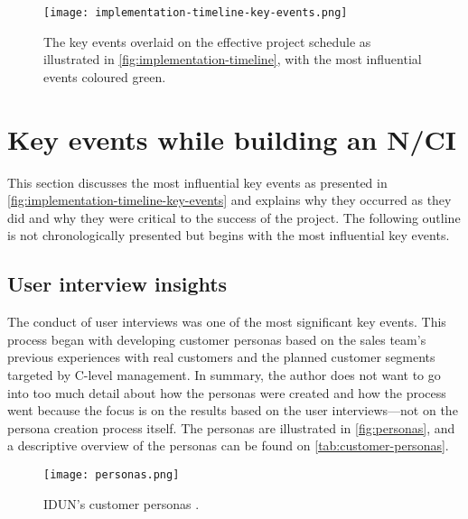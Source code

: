 \begin{figure}[!ht]
  \centering
  \texttt{[image: implementation-timeline-key-events.png]}
  \caption{The key events overlaid on the effective project schedule as illustrated in \autoref{fig:implementation-timeline}, with the most influential events coloured green.}
  \label{fig:implementation-timeline-key-events}
\end{figure}

\section{Key events while building an N/CI}
\label{chapter4-key-events}

This section discusses the most influential key events as presented in \autoref{fig:implementation-timeline-key-events} and explains why they occurred as they did and why they were critical to the success of the project. The following outline is not chronologically presented but begins with the most influential key events.

\subsection{User interview insights}
\label{chapter4-user-interview-insights}

The conduct of user interviews was one of the most significant key events. This process began with developing customer personas based on the sales team’s previous experiences with real customers and the planned customer segments targeted by C-level management. In summary, the author does not want to go into too much detail about how the personas were created and how the process went because the focus is on the results based on the user interviews—not on the persona creation process itself. The personas are illustrated in \autoref{fig:personas}, and a descriptive overview of the personas can be found on \autoref{tab:customer-personas}.

\begin{figure}[!ht]
  \centering
  \texttt{[image: personas.png]}
  \caption[IDUN’s customer personas.]{IDUN’s customer personas \citep{idun_guardian_nodate}.}
  \label{fig:personas}
\end{figure}

